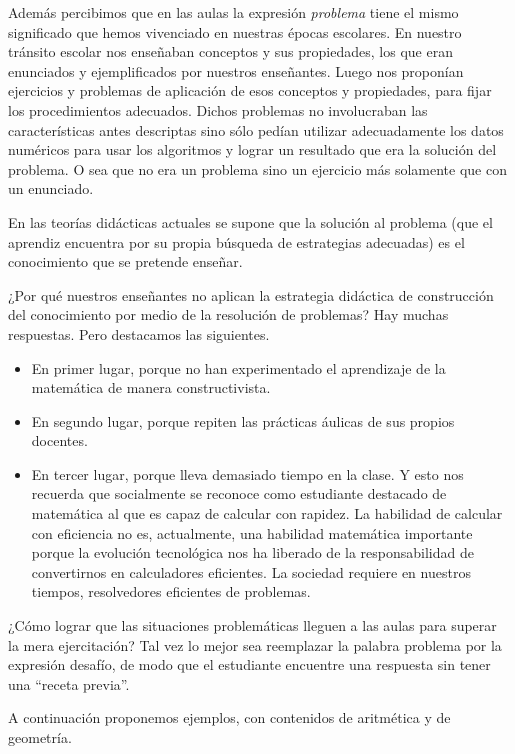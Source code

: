 \documentclass[oneside,spanish]{amsart}
\numberwithin{equation}{section}
\numberwithin{figure}{section}
\theoremstyle{definition}
\begin{document}
Además percibimos que en las aulas la expresión \textit{problema} tiene el mismo significado que hemos vivenciado en nuestras épocas escolares. En nuestro tránsito escolar nos enseñaban conceptos y sus propiedades, los que eran enunciados y ejemplificados por nuestros enseñantes. Luego nos proponían ejercicios y problemas de aplicación de esos conceptos y propiedades, para fijar los procedimientos adecuados. Dichos problemas no involucraban las características antes descriptas sino sólo pedían utilizar adecuadamente los datos numéricos para usar los algoritmos y lograr un resultado que era la solución del problema. O sea que no era un problema sino un ejercicio más solamente que con un enunciado. 

En las teorías didácticas actuales se supone que la solución al problema (que el aprendiz encuentra por su propia búsqueda de estrategias adecuadas) es el conocimiento que se pretende enseñar.

¿Por qué nuestros enseñantes no aplican la estrategia didáctica de construcción del conocimiento por medio de la resolución de problemas? Hay muchas respuestas. Pero destacamos las siguientes.

\begin{itemize}
	\item En primer lugar, porque no han experimentado el aprendizaje de la matemática de manera constructivista.
	
	\item En segundo lugar, porque repiten las prácticas áulicas de sus propios docentes.
	
	\item En tercer lugar, porque lleva demasiado tiempo en la clase. Y esto nos recuerda que socialmente se reconoce como estudiante destacado de matemática al que es capaz de calcular con rapidez. La habilidad de calcular con eficiencia no es, actualmente, una habilidad matemática importante porque la evolución tecnológica nos ha liberado de la responsabilidad de convertirnos en calculadores eficientes. La sociedad requiere en nuestros tiempos, resolvedores eficientes de problemas.
\end{itemize}

¿Cómo lograr que las situaciones problemáticas lleguen a las aulas para superar la mera ejercitación? Tal vez lo mejor sea reemplazar la palabra problema por la expresión desafío, de modo que el estudiante encuentre una respuesta sin tener una “receta previa”.

A continuación proponemos ejemplos, con contenidos de aritmética y de geometría.
\end{document}
